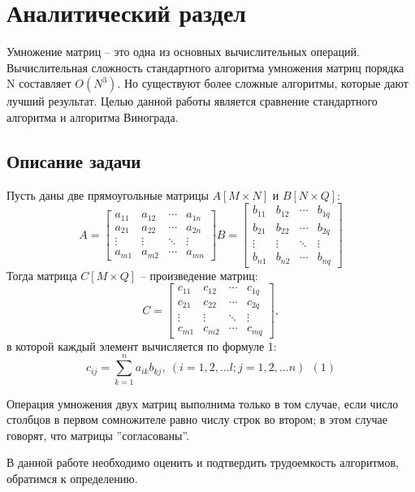 \chapter{Аналитический раздел}
\label{cha:analysis}

 Умножение матриц – это одна из основных вычислительных операций. Вычислительная сложность стандартного алгоритма умножения матриц порядка N составляет $O(N^3)$. Но существуют более сложные алгоритмы, которые дают лучший результат. Целью данной работы является сравнение стандартного алгоритма и алгоритма Винограда. 


\section{Описание задачи}
\hfill

Пусть даны две прямоугольные матрицы $A[M \times N]$ и $B[N \times Q]$:
$$
A =
\begin{bmatrix} 
a_{11} & a_{12} & \cdots & a_{1n} \\
    a_{21} & a_{22} & \cdots & a_{2n} \\ 
\vdots & \vdots & \ddots & \vdots \\ 
a_{m1} & a_{m2} & \cdots & a_{mn}
\end{bmatrix}
B =   
\begin{bmatrix} 
b_{11} & b_{12} & \cdots & b_{1q} \\
b_{21} & b_{22} & \cdots & b_{2q} \\ 
\vdots & \vdots & \ddots & \vdots \\ 
    b_{n1} & b_{n2} & \cdots & b_{nq}
\end{bmatrix}
$$
Тогда матрица $C[M \times Q]$ -- произведение матриц:
$$
C = 
\begin{bmatrix} 
    c_{11} & c_{12} & \cdots & c_{1q} \\
c_{21} & c_{22} & \cdots & c_{2q} \\ 
\vdots & \vdots & \ddots & \vdots \\ 
    c_{m1} & c_{m2} & \cdots & c_{mq}
\end{bmatrix},
$$
в которой каждый элемент вычисляется по формуле 1: 
$$c_{ij} = \sum_{k=1}^n a_{ik}b_{kj}, ~(i=1, 2, \ldots l;j=1, 2, \ldots n)~~(1)$$

Операция умножения двух матриц выполнима только в том случае, если число столбцов в первом сомножителе равно числу строк во втором; в этом случае говорят, что матрицы ''согласованы''.

В данной работе необходимо оценить и подтвердить трудоемкость алгоритмов, обратимся к определению. 

